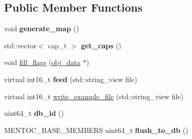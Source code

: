 \subsection*{Public Member Functions}
\begin{DoxyCompactItemize}
\item 
\mbox{\label{structmods_1_1yaml_1_1armor__description__t_a1ce235b94625d606be81fd63f8a44d23}} 
void {\bfseries generate\+\_\+map} ()
\item 
\mbox{\label{structmods_1_1yaml_1_1armor__description__t_ac11e6bd1199c4389437a6f6e38417adc}} 
std\+::vector$<$ cap\+\_\+t $>$ {\bfseries get\+\_\+caps} ()
\item 
void \hyperlink{structmods_1_1yaml_1_1armor__description__t_a1a5bae0c51fe6c0fd58519f7f6141ab6}{fill\+\_\+flags} (\hyperlink{structobj__data}{obj\+\_\+data} $\ast$)
\item 
\mbox{\label{structmods_1_1yaml_1_1armor__description__t_a6d635838841285aa5b111815c4ccc351}} 
virtual int16\+\_\+t {\bfseries feed} (std\+::string\+\_\+view file)
\item 
virtual int16\+\_\+t \hyperlink{structmods_1_1yaml_1_1armor__description__t_aa4e2c2d35b1a594e7506819e206f6719}{write\+\_\+example\+\_\+file} (std\+::string\+\_\+view file)
\item 
\mbox{\label{structmods_1_1yaml_1_1armor__description__t_af6e67f5b380c9c00a4d3ad19d72fcece}} 
uint64\+\_\+t {\bfseries db\+\_\+id} ()
\item 
\mbox{\label{structmods_1_1yaml_1_1armor__description__t_aa7e38d2d74ec0e28dda16a66f01b6273}} 
M\+E\+N\+T\+O\+C\+\_\+\+B\+A\+S\+E\+\_\+\+M\+E\+M\+B\+E\+RS uint64\+\_\+t {\bfseries flush\+\_\+to\+\_\+db} ()
\end{DoxyCompactItemize}
